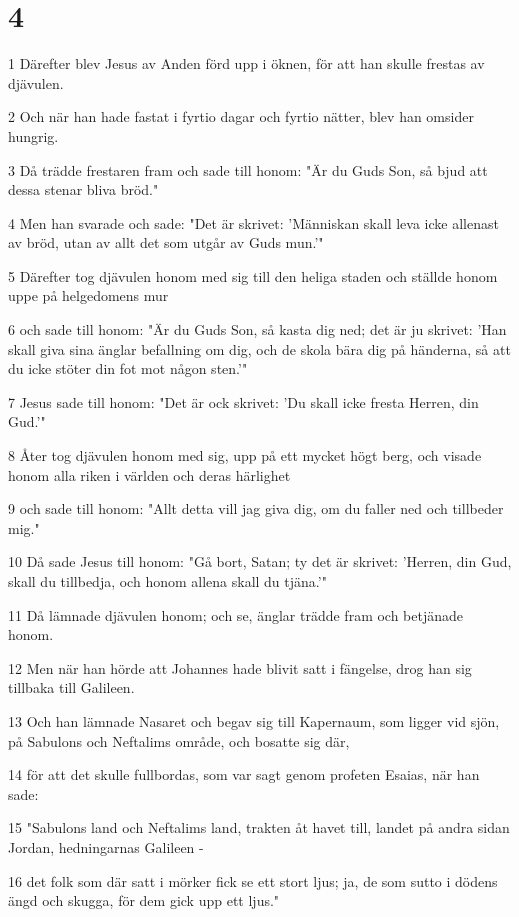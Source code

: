 \chapter{4}

\par 1 Därefter blev Jesus av Anden förd upp i öknen, för att han skulle frestas av djävulen.
\par 2 Och när han hade fastat i fyrtio dagar och fyrtio nätter, blev han omsider hungrig.
\par 3 Då trädde frestaren fram och sade till honom: "Är du Guds Son, så bjud att dessa stenar bliva bröd."
\par 4 Men han svarade och sade: "Det är skrivet: 'Människan skall leva icke allenast av bröd, utan av allt det som utgår av Guds mun.'"
\par 5 Därefter tog djävulen honom med sig till den heliga staden och ställde honom uppe på helgedomens mur
\par 6 och sade till honom: "Är du Guds Son, så kasta dig ned; det är ju skrivet: 'Han skall giva sina änglar befallning om dig, och de skola bära dig på händerna, så att du icke stöter din fot mot någon sten.'"
\par 7 Jesus sade till honom: "Det är ock skrivet: 'Du skall icke fresta Herren, din Gud.'"
\par 8 Åter tog djävulen honom med sig, upp på ett mycket högt berg, och visade honom alla riken i världen och deras härlighet
\par 9 och sade till honom: "Allt detta vill jag giva dig, om du faller ned och tillbeder mig."
\par 10 Då sade Jesus till honom: "Gå bort, Satan; ty det är skrivet: 'Herren, din Gud, skall du tillbedja, och honom allena skall du tjäna.'"
\par 11 Då lämnade djävulen honom; och se, änglar trädde fram och betjänade honom.
\par 12 Men när han hörde att Johannes hade blivit satt i fängelse, drog han sig tillbaka till Galileen.
\par 13 Och han lämnade Nasaret och begav sig till Kapernaum, som ligger vid sjön, på Sabulons och Neftalims område, och bosatte sig där,
\par 14 för att det skulle fullbordas, som var sagt genom profeten Esaias, när han sade:
\par 15 "Sabulons land och Neftalims land, trakten åt havet till, landet på andra sidan Jordan, hedningarnas Galileen -
\par 16 det folk som där satt i mörker fick se ett stort ljus; ja, de som sutto i dödens ängd och skugga, för dem gick upp ett ljus."
